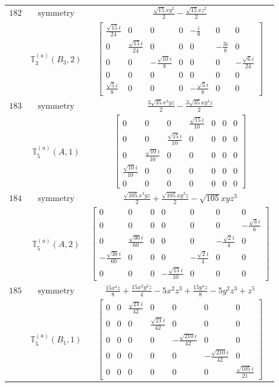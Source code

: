 \documentclass[fleqn,8pt,landscape]{jsarticle}
\begin{document}
\begin{longtable}{ccc}
$ 182 $ & $ \text{symmetry} $ & $ \frac{\sqrt{15} x y^{2}}{2} - \frac{\sqrt{15} x z^{2}}{2} $ \\
$  $ & $ \mathbb{T}_{3}^{(a)}(B_{3},2) $ & $ \begin{bmatrix} \frac{\sqrt{15} i}{24} & 0 & 0 & 0 & - \frac{i}{8} & 0 & 0 \\ 0 & \frac{\sqrt{15} i}{24} & 0 & 0 & 0 & - \frac{3 i}{8} & 0 \\ 0 & 0 & - \frac{\sqrt{10} i}{8} & 0 & 0 & 0 & - \frac{\sqrt{6} i}{24} \\ 0 & 0 & 0 & 0 & 0 & 0 & 0 \\ \frac{\sqrt{5} i}{8} & 0 & 0 & 0 & - \frac{\sqrt{3} i}{8} & 0 & 0 \end{bmatrix} $ \\ \hline
$ 183 $ & $ \text{symmetry} $ & $ \frac{3 \sqrt{35} x^{3} y z}{2} - \frac{3 \sqrt{35} x y^{3} z}{2} $ \\
$  $ & $ \mathbb{T}_{5}^{(a)}(A,1) $ & $ \begin{bmatrix} 0 & 0 & 0 & \frac{\sqrt{15} i}{10} & 0 & 0 & 0 \\ 0 & 0 & \frac{\sqrt{15} i}{10} & 0 & 0 & 0 & 0 \\ 0 & \frac{\sqrt{10} i}{10} & 0 & 0 & 0 & 0 & 0 \\ \frac{\sqrt{10} i}{10} & 0 & 0 & 0 & 0 & 0 & 0 \\ 0 & 0 & 0 & 0 & 0 & 0 & 0 \end{bmatrix} $ \\ \hline
$ 184 $ & $ \text{symmetry} $ & $ \frac{\sqrt{105} x^{3} y z}{2} + \frac{\sqrt{105} x y^{3} z}{2} - \sqrt{105} x y z^{3} $ \\
$  $ & $ \mathbb{T}_{5}^{(a)}(A,2) $ & $ \begin{bmatrix} 0 & 0 & 0 & 0 & 0 & 0 & 0 \\ 0 & 0 & 0 & 0 & 0 & 0 & - \frac{\sqrt{3} i}{6} \\ 0 & \frac{\sqrt{30} i}{60} & 0 & 0 & 0 & - \frac{\sqrt{2} i}{4} & 0 \\ - \frac{\sqrt{30} i}{60} & 0 & 0 & 0 & - \frac{\sqrt{2} i}{4} & 0 & 0 \\ 0 & 0 & 0 & - \frac{\sqrt{15} i}{10} & 0 & 0 & 0 \end{bmatrix} $ \\ \hline
$ 185 $ & $ \text{symmetry} $ & $ \frac{15 x^{4} z}{8} + \frac{15 x^{2} y^{2} z}{4} - 5 x^{2} z^{3} + \frac{15 y^{4} z}{8} - 5 y^{2} z^{3} + z^{5} $ \\
$  $ & $ \mathbb{T}_{5}^{(a)}(B_{1},1) $ & $ \begin{bmatrix} 0 & 0 & \frac{\sqrt{21} i}{42} & 0 & 0 & 0 & 0 \\ 0 & 0 & 0 & \frac{\sqrt{21} i}{42} & 0 & 0 & 0 \\ 0 & 0 & 0 & 0 & - \frac{\sqrt{210} i}{42} & 0 & 0 \\ 0 & 0 & 0 & 0 & 0 & - \frac{\sqrt{210} i}{42} & 0 \\ 0 & 0 & 0 & 0 & 0 & 0 & \frac{\sqrt{105} i}{21} \end{bmatrix} $ \\ \hline

\end{longtable}
\end{document}
